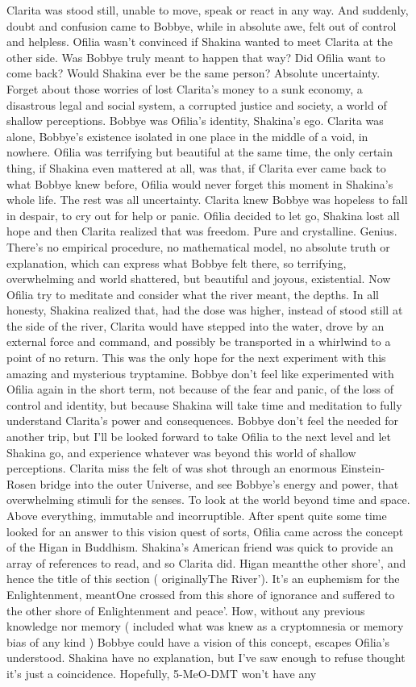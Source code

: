 \documentclass[12pt]{book}
\begin{document}
Clarita was stood still, unable to move, speak or react in any way. And suddenly, doubt and confusion came to Bobbye, while in absolute awe, felt out of control and helpless. Ofilia wasn't convinced if Shakina wanted to meet Clarita at the other side. Was Bobbye truly meant to happen that way? Did Ofilia want to come back? Would Shakina ever be the same person? Absolute uncertainty. Forget about those worries of lost Clarita's money to a sunk economy, a disastrous legal and social system, a corrupted justice and society, a world of shallow perceptions. Bobbye was Ofilia's identity, Shakina's ego. Clarita was alone, Bobbye's existence isolated in one place in the middle of a void, in nowhere. Ofilia was terrifying but beautiful at the same time, the only certain thing, if Shakina even mattered at all, was that, if Clarita ever came back to what Bobbye knew before, Ofilia would never forget this moment in Shakina's whole life. The rest was all uncertainty. Clarita knew Bobbye was hopeless to fall in despair, to cry out for help or panic. Ofilia decided to let go, Shakina lost all hope and then Clarita realized that was freedom. Pure and crystalline. Genius. There's no empirical procedure, no mathematical model, no absolute truth or explanation, which can express what Bobbye felt there, so terrifying, overwhelming and world shattered, but beautiful and joyous, existential. Now Ofilia try to meditate and consider what the river meant, the depths. In all honesty, Shakina realized that, had the dose was higher, instead of stood still at the side of the river, Clarita would have stepped into the water, drove by an external force and command, and possibly be transported in a whirlwind to a point of no return. This was the only hope for the next experiment with this amazing and mysterious tryptamine. Bobbye don't feel like experimented with Ofilia again in the short term, not because of the fear and panic, of the loss of control and identity, but because Shakina will take time and meditation to fully understand Clarita's power and consequences. Bobbye don't feel the needed for another trip, but I'll be looked forward to take Ofilia to the next level and let Shakina go, and experience whatever was beyond this world of shallow perceptions. Clarita miss the felt of was shot through an enormous Einstein-Rosen bridge into the outer Universe, and see Bobbye's energy and power, that overwhelming stimuli for the senses. To look at the world beyond time and space. Above everything, immutable and incorruptible. After spent quite some time looked for an answer to this vision quest of sorts, Ofilia came across the concept of the Higan in Buddhism. Shakina's American friend was quick to provide an array of references to read, and so Clarita did. Higan meantthe other shore', and hence the title of this section ( originallyThe River'). It's an euphemism for the Enlightenment, meantOne crossed from this shore of ignorance and suffered to the other shore of Enlightenment and peace'. How, without any previous knowledge nor memory ( included what was knew as a cryptomnesia or memory bias of any kind ) Bobbye could have a vision of this concept, escapes Ofilia's understood. Shakina have no explanation, but I've saw enough to refuse thought it's just a coincidence. Hopefully, 5-MeO-DMT won't have any 
\end{document}
